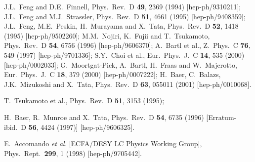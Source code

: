\documentclass[12pt]{article}
\begin{document}
\begin{thebibliography}{999}
J.L.~Feng and D.E.~Finnell,
  Phys.\ Rev.\ D {\bf 49}, 2369 (1994)
  [hep-ph/9310211];
J.L.~Feng and M.J.~Strassler,
  Phys.\ Rev.\ D {\bf 51}, 4661 (1995)
  [hep-ph/9408359];
J.L.~Feng, M.E.~Peskin, H.~Murayama and X.~Tata,
  Phys.\ Rev.\ D {\bf 52}, 1418 (1995)
  [hep-ph/9502260];
M.M.~Nojiri, K.~Fujii and T.~Tsukamoto,
  Phys.\ Rev.\ D {\bf 54}, 6756 (1996)
  [hep-ph/9606370];
A.~Bartl et al., 
  Z.\ Phys.\ C {\bf 76}, 549 (1997)
  [hep-ph/9701336];
S.Y.~Choi et al., 
  Eur.\ Phys.\ J.\ C {\bf 14}, 535 (2000)
  [hep-ph/0002033];
G.~Moortgat-Pick, A.~Bartl, H.~Fraas and W.~Majerotto,
  Eur.\ Phys.\ J.\ C {\bf 18}, 379 (2000)
  [hep-ph/0007222];
H.~Baer, C.~Balazs, J.K.~Mizukoshi and X.~Tata,
  Phys.\ Rev.\ D {\bf 63}, 055011 (2001)
  [hep-ph/0010068].

T.~Tsukamoto et al.,
  Phys.\ Rev.\ D {\bf 51}, 3153 (1995);

H.~Baer, R.~Munroe and X.~Tata, 
  Phys.\ Rev.\ D {\bf 54}, 6735 (1996)
  [Erratum-ibid.\ D {\bf 56}, 4424 (1997)]
  [hep-ph/9606325].

E.~Accomando {\it et al.}  [ECFA/DESY LC Physics Working Group],
  Phys.\ Rept.\  {\bf 299}, 1 (1998)
  [hep-ph/9705442].


\end{thebibliography}
\end{document}
